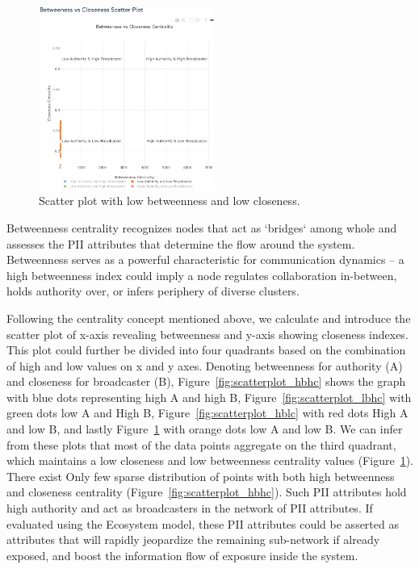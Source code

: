 \documentclass[conference]{IEEEtran}
\begin{document}
\begin{figure}[h!]
  \includegraphics[width=\linewidth, height=6cm]{scatterplot_orange.png}
  \caption{Scatter plot with low betweenness and low closeness.}
  \label{fig:scatterplot_lblc}
\end{figure}

Betweenness centrality recognizes nodes that act as `bridges` among whole and assesses the PII attributes that determine the flow around the system. Betweenness serves as a powerful characteristic for communication dynamics -- a high betweenness index could imply a node regulates collaboration in-between, holds authority over,  or infers periphery of diverse clusters.




Following the centrality concept mentioned above, we calculate and introduce the scatter plot of x-axis revealing betweenness and y-axis showing closeness indexes.  This plot could further be divided into four quadrants based on the combination of high and low values on x and y axes. Denoting betweenness for authority (A) and closeness for broadcaster (B), Figure~\ref{fig:scatterplot_hbhc} shows the graph with blue dots representing high A and high B, Figure~\ref{fig:scatterplot_lbhc} with green dots low A and High B, Figure~\ref{fig:scatterplot_hblc} with red dots High A and low B, and lastly Figure~\ref{fig:scatterplot_lblc} with orange dots low A and low B. We can infer from these plots that most of the data points aggregate on the third quadrant, which maintains a low closeness and low betweenness centrality values (Figure~\ref{fig:scatterplot_lblc}). There exist Only few sparse distribution of points with both high betweenness and closeness centrality (Figure~\ref{fig:scatterplot_hbhc}). Such PII attributes hold high authority and act as broadcasters in the network of PII attributes. If evaluated using the Ecosystem model, these PII attributes could be asserted as attributes that will rapidly jeopardize the remaining sub-network if already exposed, and boost the information flow of exposure inside the system.
\end{document}
